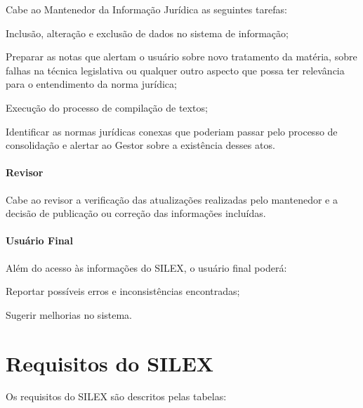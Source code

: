 \documentclass[a4paper,11pt,openright,twoside,brazil]{abntex2}
\begin{document}
Cabe ao Mantenedor da Informação Jurídica as seguintes tarefas:

\begin{alineas}
 \item Inclusão, alteração e exclusão de dados no sistema de informação;
 \item Preparar as notas que alertam o usuário sobre novo tratamento da matéria,
 sobre falhas na técnica legislativa ou qualquer outro aspecto que possa ter
 relevância para o entendimento da norma jurídica;
 \item Execução do processo de compilação de textos;
 \item Identificar as normas jurídicas conexas que poderiam passar pelo processo
 de consolidação e alertar ao Gestor sobre a existência desses atos.
\end{alineas}

\subsubsection{Revisor}
\label{sec-papel-revisor}

Cabe ao revisor a verificação das atualizações realizadas pelo mantenedor e a
decisão de publicação ou correção das informações incluídas.

\subsubsection{Usuário Final}
\label{sec-papel-usuario-final}

Além do acesso às informações do SILEX, o usuário final poderá:

\begin{alineas}
 \item Reportar possíveis erros e inconsistências encontradas;
 \item Sugerir melhorias no sistema.
\end{alineas}

\chapter{Requisitos do SILEX}
\label{cap_requisitos}

Os requisitos do SILEX são descritos pelas tabelas:

\silextabelasrequisitos
\end{document}
